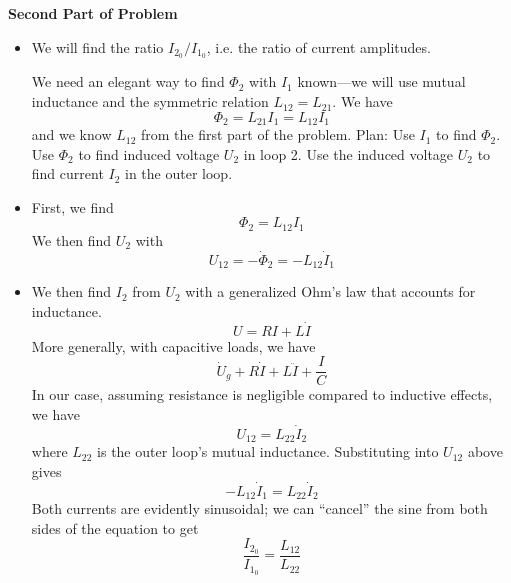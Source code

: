 \documentclass[11pt, a4paper]{article}
\begin{document}
\textbf{Second Part of Problem}
\begin{itemize}
	\item We will find the ratio $ I_{2_{0}} / I_{1_{0}} $, i.e. the ratio of current amplitudes. 
	
	We need an elegant way to find $ \Phi_{2} $ with $ I_{1} $ known---we will use mutual inductance and the symmetric relation $ L_{12} = L_{21} $. We have
	\begin{equation*}
		\Phi_{2} = L_{21}I_{1} = L_{12} I_{1}
	\end{equation*}
	and we know $ L_{12} $ from the first part of the problem. Plan: Use $ I_{1} $ to find $ \Phi_{2} $. Use $ \Phi_{2} $ to find induced voltage $ U_{2} $ in loop 2. Use the induced voltage $ U_{2} $ to find current $ I_{2} $ in the outer loop.
	
	\item First, we find
	\begin{equation*}
		\Phi_{2} = L_{12} I_{1}
	\end{equation*}
	We then find $ U_{2} $ with
	\begin{equation*}
		U_{12} = - \dot{\Phi}_{2} = - L_{12}\dot{I}_{1}
	\end{equation*}
	
	\item We then find $ I_{2} $ from $ U_{2} $ with a generalized Ohm's law that accounts for inductance. 
	\begin{equation*}
		U = RI + L\dot{I} 
	\end{equation*}
	More generally, with capacitive loads, we have
	\begin{equation*}
		\dot{U}_{g} + R\dot{I} + L \ddot{I} + \frac{I}{C}
	\end{equation*}
	In our case, assuming resistance is negligible compared to inductive effects, we have
	\begin{equation*}
		U_{12} = L_{22} \dot{I}_{2}
	\end{equation*}
	where $ L_{22} $ is the outer loop's mutual inductance. Substituting into $ U_{12} $ above gives
	\begin{equation*}
		-L_{12} \dot{I}_{1} = L_{22}\dot{I}_{2}
	\end{equation*}
	Both currents are evidently sinusoidal; we can ``cancel'' the sine from both sides of the equation to get
	\begin{equation*}
		\frac{I_{2_{0}}}{I_{1_{0}}} = \frac{L_{12}}{L_{22}}
	\end{equation*}
	

\end{itemize}
\end{document}
